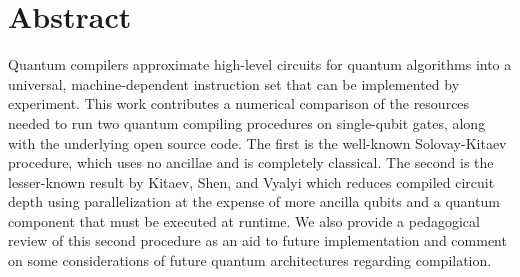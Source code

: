 \section{Abstract}

Quantum compilers approximate high-level circuits for quantum algorithms
into a universal, machine-dependent
instruction set that can be implemented by experiment. This work contributes
a numerical comparison of the
resources needed to run two quantum compiling procedures on single-qubit gates,
along with the underlying open source code.
The first is the well-known Solovay-Kitaev procedure, which uses no ancillae and
is completely classical. The second is the lesser-known result by Kitaev,
Shen, and Vyalyi which reduces compiled
circuit depth using parallelization at the expense of more ancilla qubits and
a quantum component that must be executed at runtime.
We also provide a pedagogical review of this second procedure as an aid to
future implementation and comment on some considerations of future
quantum architectures regarding compilation.